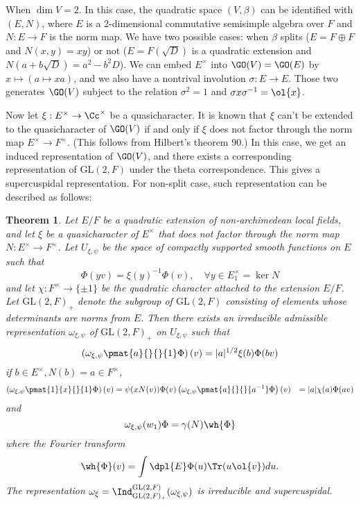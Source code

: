 \documentclass{article}
\newtheorem{theorem}{Theorem}[section]
\newcommand{\GL}{\mathrm{GL}}
\begin{document}
When $\dim V = 2$. In this case, the quadratic space $(V, \beta)$ can be identified with $(E, N)$, where $E$ is a 2-dimensional commutative semisimple algebra over $F$ and $N:E\to F$ is the norm map. 
We have two possible cases: when $\beta$ splits ($E = F\oplus F$ and $N(x, y) = xy$) or not ($E = F(\sqrt{D})$ is a quadratic extension and $N(a+b\sqrt{D}) = a^{2} - b^{2}D$). 
We can embed $E^{\times}$ into $\GO(V) = \GO(E)$ by $x\mapsto (a\mapsto xa)$, and we also have a nontrival involution $\sigma:E\to E$. Those two generates $\GO(V)$ subject to the relation $\sigma^{2} =1$ and $\sigma x \sigma^{-1} = \ol{x}$. 

Now let $\xi:E^{\times} \to \Cc^{\times}$ be a quasicharacter. It is known that $\xi$ can't be extended to the quasicharacter of $\GO(V)$ if and only if $\xi$ does not factor through the norm map $E^{\times} \to F^{\times}$. (This follows from Hilbert's theorem 90.) 
In this case, we get an induced representation of $\GO(V)$, and there exists a corresponding representation of $\GL(2, F)$ under the theta correspondence. This gives a supercuspidal representation. For non-split case, such representation can be described as follows:
\begin{theorem}
Let $E/F$ be a quadratic extension of non-archimedean local fields, and let $\xi$ be a quasicharacter of $E^{\times}$ that does not factor through the norm map $N:E^{\times} \to F^{\times}$. 
Let $U_{\xi, \psi}$ be the space of compactly supported smooth functions on $E$ such that 
$$
\Phi(yv) = \xi(y)^{-1}\Phi(v), \quad \forall y\in E_{1}^{\times} = \ker N
$$
and let $\chi: F^{\times} \to \{\pm 1\}$ be the quadratic character attached to the extension $E/F$. 
Let $\GL(2, F)_{+}$ denote the subgroup of $\GL(2, F)$ consisting of elements whose determinants are norms from $E$. 
Then there exists an irreducible admissible representation $\omega_{\xi, \psi}$ of $\GL(2, F)_{+}$ on $U_{\xi, \psi}$ such that 
$$
\left(\omega_{\xi, \psi}\pmat{a}{}{}{1} \Phi\right)(v) = |a|^{1/2} \xi(b) \Phi(bv)
$$
if $b\in E^{\times}, N(b) = a\in F^{\times}$, 
\begin{align*}
\left(\omega_{\xi, \psi}\pmat{1}{x}{}{1} \Phi\right)(v) &= \psi(xN(v)) \Phi(v)
\left(\omega_{\xi, \psi}\pmat{a}{}{}{a^{-1}} \Phi\right)(v) &= |a|\chi(a)\Phi(av)
\end{align*}
and
$$
\omega_{\xi, \psi}(w_{1})\Phi = \gamma(N)\wh{\Phi}
$$
where the Fourier transform
$$
\wh{\Phi}(v) = \int\dpl{E} \Phi(u) \Tr(u\ol{v}) du.
$$
The representation $\omega_{\xi} = \Ind_{\GL(2, F)_{+}}^{\GL(2, F)}(\omega_{\xi, \psi})$  is irreducible and supercuspidal. 
\end{theorem}
\end{document}
